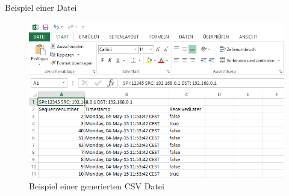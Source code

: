 \noindent Beispiel einer Datei

\begin{figure}[H]
    \begin{center}
        \includegraphics[trim=1 0 0 0,clip,width=\textwidth]{start/img/Datei.png}
    \end{center}
    \caption{Beispiel einer generierten CSV Datei}
\end{figure}